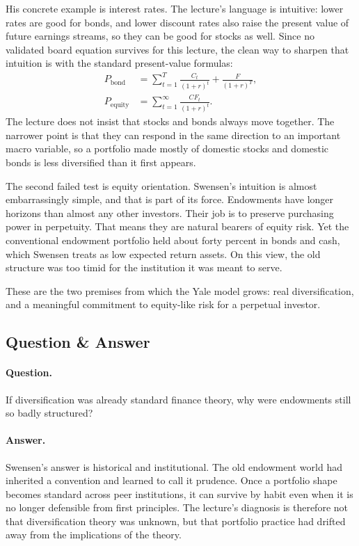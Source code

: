 His concrete example is interest rates. The lecture's language is intuitive: lower rates are good for bonds, and lower discount rates also raise the present value of future earnings streams, so they can be good for stocks as well. Since no validated board equation survives for this lecture, the clean way to sharpen that intuition is with the standard present-value formulas:
\begin{align}
P_{\text{bond}} &= \sum_{t=1}^{T}\frac{C_t}{(1+r)^t}+\frac{F}{(1+r)^T},\\
P_{\text{equity}} &= \sum_{t=1}^{\infty}\frac{CF_t}{(1+r)^t}.
\end{align}
The lecture does not insist that stocks and bonds always move together. The narrower point is that they can respond in the same direction to an important macro variable, so a portfolio made mostly of domestic stocks and domestic bonds is less diversified than it first appears.

The second failed test is equity orientation. Swensen's intuition is almost embarrassingly simple, and that is part of its force. Endowments have longer horizons than almost any other investors. Their job is to preserve purchasing power in perpetuity. That means they are natural bearers of equity risk. Yet the conventional endowment portfolio held about forty percent in bonds and cash, which Swensen treats as low expected return assets. On this view, the old structure was too timid for the institution it was meant to serve.

These are the two premises from which the Yale model grows: real diversification, and a meaningful commitment to equity-like risk for a perpetual investor.

\subsection{Question \& Answer}

\paragraph{Question.} If diversification was already standard finance theory, why were endowments still so badly structured?

\paragraph{Answer.} Swensen's answer is historical and institutional. The old endowment world had inherited a convention and learned to call it prudence. Once a portfolio shape becomes standard across peer institutions, it can survive by habit even when it is no longer defensible from first principles. The lecture's diagnosis is therefore not that diversification theory was unknown, but that portfolio practice had drifted away from the implications of the theory.

